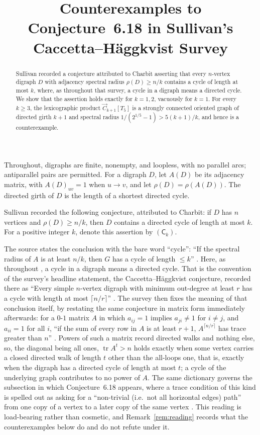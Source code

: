\documentclass[11pt]{amsart}
\title[Conjecture~6.18 in Sullivan's survey]
      {Counterexamples to Conjecture~6.18 in Sullivan's
       Caccetta--H\"aggkvist Survey}
\date{}
\theoremstyle{remark}
\begin{document}
\begin{abstract}
Sullivan recorded a conjecture attributed to Charbit asserting that every
$n$-vertex digraph $D$ with adjacency spectral radius $\rho(D)\ge n/k$
contains a cycle of length at most $k$, where, as throughout that survey,
a cycle in a digraph means a directed cycle. We show that the assertion
holds exactly for $k=1,2$, vacuously for $k=1$. For every $k\ge3$, the
lexicographic product $\vec C_{k+1}[T_5]$ is a strongly connected oriented
graph of directed girth $k+1$ and spectral radius
$1/(2^{1/5}-1)>5(k+1)/k$, and hence is a counterexample.
\end{abstract}

\maketitle

Throughout, digraphs are finite, nonempty, and loopless, with no parallel
arcs; antiparallel pairs are permitted. For a digraph $D$, let $A(D)$ be
its adjacency matrix, with $A(D)_{uv}=1$ when $u\to v$, and let
$\rho(D)=\rho(A(D))$. The directed girth of $D$ is the length of a shortest
directed cycle.

Sullivan \cite[Conjecture~6.18]{Sullivan} recorded the following conjecture,
attributed to Charbit: if $D$ has $n$ vertices and $\rho(D)\ge n/k$, then
$D$ contains a directed cycle of length at most $k$. For a positive integer
$k$, denote this assertion by $(\mathsf C_k)$.

The source states the conclusion with the bare word ``cycle'': ``If the
spectral radius of $A$ is at least $n/k$, then $G$ has a cycle of length
$\le k$'' \cite[Conjecture~6.18]{Sullivan}. Here, as throughout
\cite{Sullivan}, a cycle in a digraph means a directed cycle. That is the
convention of the survey's headline statement, the Caccetta--H\"aggkvist
conjecture, recorded there as ``Every simple $n$-vertex digraph with
minimum out-degree at least $r$ has a cycle with length at most
$\lceil n/r\rceil$'' \cite[Conjecture~2.1]{Sullivan}. The survey then
fixes the meaning of that conclusion itself, by restating the same
conjecture in matrix form immediately afterwards: for a $0$-$1$ matrix $A$
in which $a_{ij}=1$ implies $a_{ji}\ne1$ for $i\ne j$, and $a_{ii}=1$ for
all $i$, ``if the sum of every row in $A$ is at least $r+1$,
$A^{\lceil n/r\rceil}$ has trace greater than $n$'' \cite[\S2]{Sullivan}.
Powers of such a matrix record directed walks and nothing else, so, the
diagonal being all ones, $\operatorname{tr}A^{t}>n$ holds exactly when
some vertex carries a closed directed walk of length $t$ other than the
all-loops one, that is, exactly when the digraph has a directed cycle of
length at most $t$; a cycle of the underlying graph contributes to no
power of $A$. The same dictionary governs the subsection in which
Conjecture~6.18 appears, where a trace condition of this kind is spelled
out as asking for a ``non-trivial (i.e.\ not all horizontal edges) path''
from one copy of a vertex to a later copy of the same vertex
\cite[Conjecture~6.17]{Sullivan}. This reading is load-bearing rather than
cosmetic, and Remark~\ref{rem:reading} records what the counterexamples
below do and do not refute under it.
\end{document}
